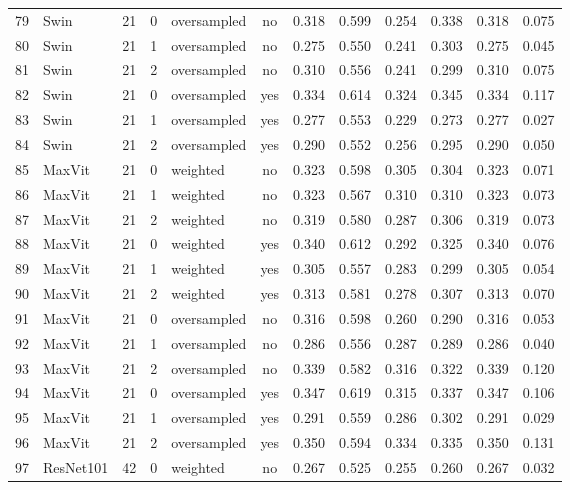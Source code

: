 \documentclass[a4paper,10pt]{book}
\begin{document}
\begin{scriptsize}
\begin{longtable}{@{}l l c c l c c c c c c c@{}}
        79 & Swin & 21 & 0 & oversampled & no & 0.318 & 0.599 & 0.254 & 0.338 & 0.318 & 0.075 \\ 
        80 & Swin & 21 & 1 & oversampled & no & 0.275 & 0.550 & 0.241 & 0.303 & 0.275 & 0.045 \\ 
        81 & Swin & 21 & 2 & oversampled & no & 0.310 & 0.556 & 0.241 & 0.299 & 0.310 & 0.075 \\ 
        82 & Swin & 21 & 0 & oversampled & yes & 0.334 & 0.614 & 0.324 & 0.345 & 0.334 & 0.117 \\ 
        83 & Swin & 21 & 1 & oversampled & yes & 0.277 & 0.553 & 0.229 & 0.273 & 0.277 & 0.027 \\ 
        84 & Swin & 21 & 2 & oversampled & yes & 0.290 & 0.552 & 0.256 & 0.295 & 0.290 & 0.050 \\ 
        85 & MaxVit & 21 & 0 & weighted & no & 0.323 & 0.598 & 0.305 & 0.304 & 0.323 & 0.071 \\ 
        86 & MaxVit & 21 & 1 & weighted & no & 0.323 & 0.567 & 0.310 & 0.310 & 0.323 & 0.073 \\ 
        87 & MaxVit & 21 & 2 & weighted & no & 0.319 & 0.580 & 0.287 & 0.306 & 0.319 & 0.073 \\ 
        88 & MaxVit & 21 & 0 & weighted & yes & 0.340 & 0.612 & 0.292 & 0.325 & 0.340 & 0.076 \\ 
        89 & MaxVit & 21 & 1 & weighted & yes & 0.305 & 0.557 & 0.283 & 0.299 & 0.305 & 0.054 \\ 
        90 & MaxVit & 21 & 2 & weighted & yes & 0.313 & 0.581 & 0.278 & 0.307 & 0.313 & 0.070 \\ 
        91 & MaxVit & 21 & 0 & oversampled & no & 0.316 & 0.598 & 0.260 & 0.290 & 0.316 & 0.053 \\ 
        92 & MaxVit & 21 & 1 & oversampled & no & 0.286 & 0.556 & 0.287 & 0.289 & 0.286 & 0.040 \\ 
        93 & MaxVit & 21 & 2 & oversampled & no & 0.339 & 0.582 & 0.316 & 0.322 & 0.339 & 0.120 \\ 
        94 & MaxVit & 21 & 0 & oversampled & yes & 0.347 & 0.619 & 0.315 & 0.337 & 0.347 & 0.106 \\ 
        95 & MaxVit & 21 & 1 & oversampled & yes & 0.291 & 0.559 & 0.286 & 0.302 & 0.291 & 0.029 \\ 
        96 & MaxVit & 21 & 2 & oversampled & yes & 0.350 & 0.594 & 0.334 & 0.335 & 0.350 & 0.131 \\ 
        97 & ResNet101 & 42 & 0 & weighted & no & 0.267 & 0.525 & 0.255 & 0.260 & 0.267 & 0.032 \\ 

\end{longtable}
\end{scriptsize}
\end{document}
